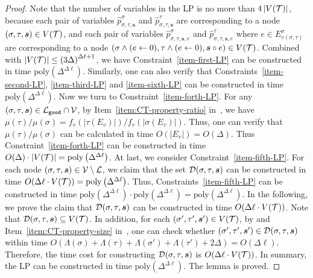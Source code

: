 \documentclass[11pt]{article}
\newcommand{\abs}[1]{\left\vert#1\right\vert}
\def\!#1{\mathtt{#1}}
\def\poly{\mathrm{poly}}
\newcommand{\BuildTime}{\poly\left(\Delta^{\Delta\ell}\right)}
\newcommand{\seqS}{\boldsymbol{s}}
\begin{document}
\begin{proof}
    Note that the number of variables in the LP is no more than $4\abs{V(\+T)}$, because each pair of variables $\widehat{p}_{\sigma, \tau, \seqS}^{\sigma}$ and $\widehat{p}_{\sigma, \tau, \seqS}^{\tau}$ are corresponding to a node $(\sigma,\tau,\seqS)\in V(\+T)$,
    and each pair of variables $\widehat{p}_{\sigma,\tau,\seqS,e}^{\sigma}$ and $\widehat{p}_{\sigma,\tau,\seqS,e}^{\tau}$ where $e\in E_{v(\sigma,\tau)}^{\sigma}$
    are corresponding to a node $(\sigma\land(e\leftarrow 0),\tau\land(e\leftarrow 0),\seqS\circ e)\in V(\+T)$.
    Combined with $\abs{V(\+T)}\leq \left(3\Delta\right)^{\Delta \ell + 1}$, we have
    Constraint~\ref{item-first-LP} can be constructed in time $\BuildTime$.
    Similarly, one can also verify that Constraints~\ref{item-second-LP}, \ref{item-third-LP} and \ref{item-sixth-LP} can be constructed in time $\BuildTime$.
    Now we turn to Constraint~\ref{item-forth-LP}.
    For any $(\sigma, \tau, \seqS) \in \+L_{\!{good}} \cap \+V$, by Item~\eqref{item:CT-property-ratio} in~, 
    we have $\mu(\tau)/\mu(\sigma) = f_v\left(\abs{\tau(E_v)}\right)/f_v\left(\abs{\sigma(E_v)}\right)$.
    Thus, one can verify that $\mu(\tau)/\mu(\sigma)$ can be calculated in time $O(\abs{E_v}) = O(\Delta)$.
    Thus Constraint~\ref{item-forth-LP} can be constructed in time 
    $O(\Delta)\cdot \abs{V(\+T)} = \poly\left(\Delta^{\Delta \ell}\right)$.
    At last, we consider Constraint~\ref{item-fifth-LP}.
    For each node $(\sigma,\tau,\seqS)\in \+V\setminus\+L$, we claim that the set $\+D(\sigma,\tau,\seqS)$ can be constructed in time $O(\Delta\ell\cdot V(\+T)) = \poly\left(\Delta^{\Delta \ell}\right)$. 
    Thus, Constraints~\ref{item-fifth-LP} can be constructed in time $\poly\left(\Delta^{\Delta \ell}\right)\cdot \poly\left(\Delta^{\Delta \ell}\right) = \poly\left(\Delta^{\Delta \ell}\right)$.
    In the following, we prove the claim that $\+D(\sigma,\tau,\seqS)$ can be constructed in time $O(\Delta\ell\cdot V(\mathcal{T}))$.
    Note that $\+D(\sigma,\tau,\seqS)\subseteq V(\+T)$.
    In addition, for each $(\sigma',\tau',\seqS')\in V(\+T)$,
    by  and Item~\eqref{item:CT-property-size} in~, one can check whether $(\sigma',\tau',\seqS')\in \+D(\sigma,\tau,\seqS)$ within time $O(\Lambda(\sigma) + \Lambda(\tau) + \Lambda(\sigma') + \Lambda(\tau') + 2\Delta) = O(\Delta\ell)$.
    Therefore, the time cost for constructing $\+D(\sigma,\tau,\seqS)$ is $O(\Delta\ell\cdot V(\mathcal{T}))$.
    In summary, the LP can be constructed in time $\poly\left(\Delta^{\Delta \ell}\right)$. The lemma is proved.
    
\end{proof}
\end{document}
